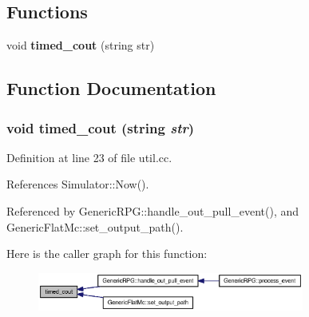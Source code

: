 \subsection*{Functions}
\begin{CompactItemize}
\item 
void {\bf timed\_\-cout} (string str)
\end{CompactItemize}


\subsection{Function Documentation}
\subsubsection[{timed\_\-cout}]{\setlength{\rightskip}{0pt plus 5cm}void timed\_\-cout (string {\em str})}\label{util_8h_06d48ba68bdaae826fc87c1db842228e}




Definition at line 23 of file util.cc.

References Simulator::Now().

Referenced by GenericRPG::handle\_\-out\_\-pull\_\-event(), and GenericFlatMc::set\_\-output\_\-path().

Here is the caller graph for this function:\nopagebreak
\begin{figure}[H]
\begin{center}
\leavevmode
\includegraphics[width=248pt]{util_8h_06d48ba68bdaae826fc87c1db842228e_icgraph}
\end{center}
\end{figure}
